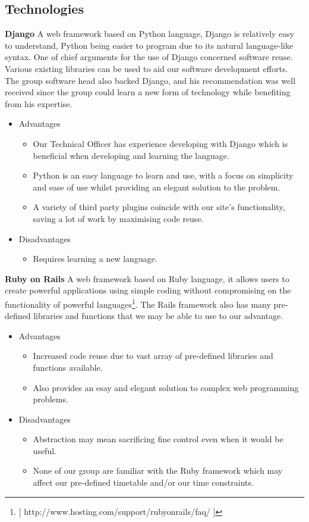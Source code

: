 \subsection{Technologies}

\textbf{Django}
\newline
\newline
A web framework based on Python language, Django is relatively easy to understand, Python being easier to program due to its natural language-like syntax. One of chief arguments for the use of Django concerned software reuse. Various existing libraries can be used to aid our software development efforts. The group software head also backed Django, and his recommendation was well received since the group could learn a new form of technology while benefiting from his expertise.
\begin{itemize}
\item Advantages
	\begin{itemize}
	\item Our Technical Officer has experience developing with Django which is beneficial when developing and learning the language.
	\item Python is an easy language to learn and use, with a focus on simplicity and ease of use whilst providing an elegant solution to the problem.
	\item A variety of third party plugins coincide with our site's functionality, saving a lot of work by maximising code 	        reuse.
	\end{itemize}
\item Disadvantages
	\begin{itemize}
	\item Requires learning a new language.
	\end{itemize}
\end{itemize}
\textbf{Ruby on Rails}
\newline
\newline
A web framework based on Ruby language, it allows users to create powerful applications using simple coding without compromising on the functionality of powerful languages\footnote{[ http://www.hosting.com/support/rubyonrails/faq/ ]}. The Rails framework also has many pre-defined libraries and functions that we may be able to use to our advantage.
\begin{itemize}
\item Advantages
	\begin{itemize}
	\item Increased code reuse due to vast array of pre-defined libraries and functions available.
	\item Also provides an esay and elegant solution to complex web programming problems.
	\end {itemize}
\item Disadvantages
	\begin{itemize}
	\item Abstraction may mean sacrificing fine control even when it would be useful.
	\item None of our group are familiar with the Ruby framework which may affect our pre-defined timetable and/or our time constraints.
	\end {itemize}
\end {itemize}
